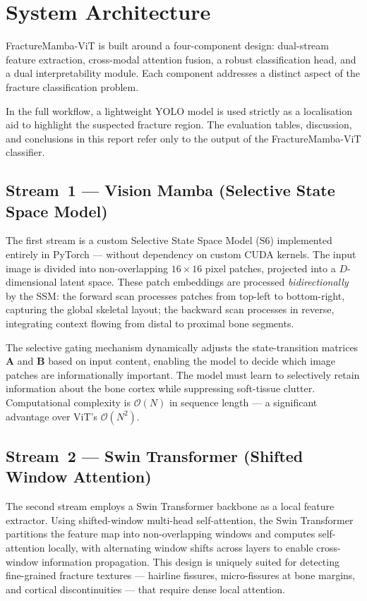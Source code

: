 \documentclass[12pt, a4paper]{article}
\begin{document}
\section{System Architecture}

FractureMamba-ViT is built around a four-component design: dual-stream feature extraction,
cross-modal attention fusion, a robust classification head, and a dual interpretability module.
Each component addresses a distinct aspect of the fracture classification problem.

In the full workflow, a lightweight YOLO model is used strictly as a localisation aid to
highlight the suspected fracture region. The evaluation tables, discussion, and conclusions in
this report refer only to the output of the FractureMamba-ViT classifier.

\subsection{Stream~1 — Vision Mamba (Selective State Space Model)}

The first stream is a custom Selective State Space Model (S6) implemented entirely in PyTorch —
without dependency on custom CUDA kernels. The input image is divided into non-overlapping
$16\times16$ pixel patches, projected into a $D$-dimensional latent space. These patch embeddings
are processed \emph{bidirectionally} by the SSM: the forward scan processes patches from
top-left to bottom-right, capturing the global skeletal layout; the backward scan processes in
reverse, integrating context flowing from distal to proximal bone segments.

The selective gating mechanism dynamically adjusts the state-transition matrices $\mathbf{A}$ and
$\mathbf{B}$ based on input content, enabling the model to decide which image patches are
informationally important. The model must learn to selectively retain information about the bone
cortex while suppressing soft-tissue clutter. Computational complexity is $\mathcal{O}(N)$ in
sequence length — a significant advantage over ViT's $\mathcal{O}(N^2)$.

\subsection{Stream~2 — Swin Transformer (Shifted Window Attention)}

The second stream employs a Swin Transformer backbone as a local feature extractor. Using
shifted-window multi-head self-attention, the Swin Transformer partitions the feature map into
non-overlapping windows and computes self-attention locally, with alternating window shifts
across layers to enable cross-window information propagation. This design is uniquely suited for
detecting fine-grained fracture textures — hairline fissures, micro-fissures at bone margins,
and cortical discontinuities — that require dense local attention.
\end{document}
